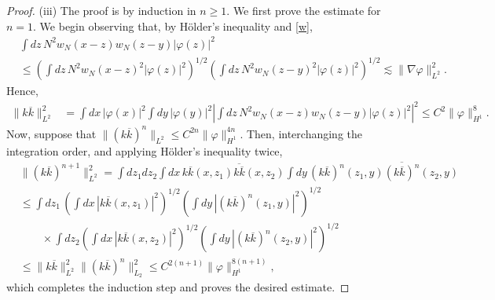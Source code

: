 \documentclass[a4paper,11pt]{article}
\begin{document}
\begin{proof}
  (iii) The proof is by induction in $n \ge 1$. We first prove the estimate
  for $n=1$. We begin observing that, by H\"older's inequality and \eqref{w},
  \begin{equation}
    \begin{aligned}
      & \int dz \, N^2 w_N(x-z) w_N(z-y) |\varphi(z)|^2 \\
      & \le \left( \int dz \, N^2 w_N(x-z)^2 |\varphi(z)|^2 \right)^{1/2} \left(
      \int dz \, N^2 w_N(z-y)^2 |\varphi(z)|^2 \right)^{1/2} \apprle \| \nabla
      \varphi \|_{L^2}^2.
    \end{aligned}
    \label{ww}
  \end{equation}
  Hence,
  \begin{align*}
    \| k \overline{k} \|_{L^2}^2 & = \int dx \, |\varphi(x)|^2 \int dy \,
    |\varphi(y)|^2 \left| \int dz \, N^2 w_N(x-z) w_N(z-y) |\varphi(z)|^2
    \right|^2 \le C^2 \| \varphi \|_{H^1}^8.
  \end{align*}
  Now, suppose that $\| (k \overline{k})^n \|_{L^2} \le C^{2n} \| \varphi
  \|_{H^1}^{4n}$. Then, interchanging the integration order, and applying
  H\"older's inequality twice,
  \begin{align*}
    & \| (k \overline{k})^{n+1} \|_{L^2}^2 = \int dz_1 dz_2 \int dx \,
    k\overline{k}(x,z_1) \overline{ k \overline{k}}(x,z_2) \int dy \,
    (k\overline{k})^n(z_1,y) \overline{ (k \overline{k})^n}(z_2,y) \\
    & \le \int dz_1 \, \left( \int dx \, | k\overline{k}(x,z_1)|^2
    \right)^{1/2} \left( \int dy \, | (k\overline{k})^n(z_1,y)|^2
    \right)^{1/2} \\
    & \qquad \times \int dz_2 \left( \int dx \, | k\overline{k}(x,z_2)|^2
    \right)^{1/2} \left( \int dy \, | (k\overline{k})^n(z_2,y)|^2
    \right)^{1/2} \\
    & \le \| k \overline{k} \|_{L^2}^2 \| (k \overline{k})^n \|_{L_2}^2 \le
    C^{2(n+1)} \| \varphi \|_{H^1}^{8(n+1)},
  \end{align*}
  which completes the induction step and proves the desired estimate.



\end{proof}
\end{document}
